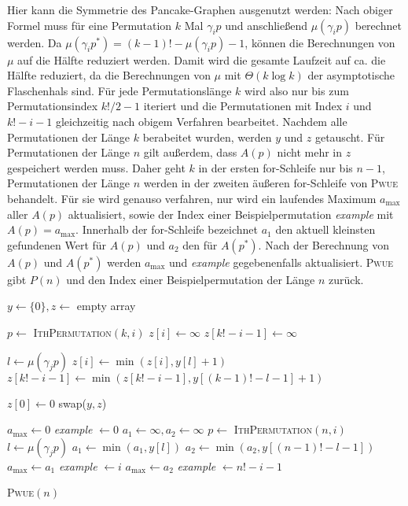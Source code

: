\documentclass[a4paper, 10pt, ngerman]{article}
\begin{document}
Hier kann die Symmetrie des Pancake-Graphen ausgenutzt werden: Nach obiger Formel muss für eine Permutation $k$ Mal $\gamma_i p$ und anschließend $\mu(\gamma_i p)$ berechnet werden. Da $\mu(\gamma_i p^*) = (k - 1)! - \mu(\gamma_i p) - 1$, können die Berechnungen von $\mu$ auf die Hälfte reduziert werden. Damit wird die gesamte Laufzeit auf ca. die Hälfte reduziert, da die Berechnungen von $\mu$ mit $\Theta(k \log k)$ der asymptotische Flaschenhals sind. Für jede Permutationslänge $k$ wird also nur bis zum Permutationsindex $k!/2 - 1$ iteriert und die Permutationen mit Index $i$ und $k! - i - 1$ gleichzeitig nach obigem Verfahren bearbeitet. Nachdem alle Permutationen der Länge $k$ berabeitet wurden, werden $y$ und $z$ getauscht. Für Permutationen der Länge $n$ gilt außerdem, dass $A(p)$ nicht mehr in $z$ gespeichert werden muss. Daher geht $k$ in der ersten for-Schleife nur bis $n - 1$, Permutationen der Länge $n$ werden in der zweiten äußeren for-Schleife von \textsc{Pwue} behandelt. Für sie wird genauso verfahren, nur wird ein laufendes Maximum $a_{\max}$ aller $A(p)$ aktualisiert, sowie der Index einer Beispielpermutation \emph{example} mit $A(p) = a_{\max}$. Innerhalb der for-Schleife bezeichnet $a_1$ den aktuell kleinsten gefundenen Wert für $A(p)$ und $a_2$ den für $A(p^*)$. Nach der Berechnung von $A(p)$ und $A(p^*)$ werden $a_{\max}$ und \emph{example} gegebenenfalls aktualisiert. \textsc{Pwue} gibt $P(n)$ und den Index einer Beispielpermutation der Länge $n$ zurück.

\begin{algorithm}
    $y \gets \{0\}, z \gets$ empty array \;

    {
        {
            $p \gets$ \textsc{IthPermutation}$(k, i)$ \;
            $z[i] \gets \infty$ \;
            $z[k! - i - 1] \gets \infty$ \;

             {
                $l \gets \mu(\gamma_j p)$ \;
                $z[i] \gets \min(z[i], y[l] + 1)$ \;
                $z[k! - i - 1] \gets \min(z[k! - i - 1], y[(k-1)! - l - 1] + 1)$ \;
            }
        }

        $z[0] \gets 0$ \;
        swap($y, z$) \;
    }
    $a_{\max} \gets 0$ \; 
    \emph{example} $\gets 0$ \;
    {
        $a_1 \gets \infty, a_2 \gets \infty$ \;
        $p \gets$ \textsc{IthPermutation}$(n, i)$ \;
        {
            $l \gets \mu(\gamma_j p)$ \;
            $a_1 \gets \min(a_1, y[l])$ \;
            $a_2 \gets \min(a_2, y[(n - 1)! - l - 1])$ \;
        }
        {
            $a_{\max} \gets a_1$ \;
            \emph{example} $\gets i$ \;
        }
        {
            $a_{\max} \gets a_2$ \;
            \emph{example} $\gets n! - i - 1$ \;
        }
    }

     \;

    \caption{\textsc{Pwue}$(n)$}
\end{algorithm}
\end{document}
